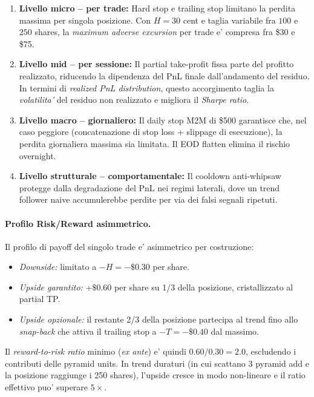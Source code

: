 \documentclass[11pt,a4paper]{article}
\begin{document}
\begin{enumerate}
    \item \textbf{Livello micro -- per trade:}
          Hard stop e trailing stop limitano la perdita massima
          per singola posizione.  Con $H = 30$ cent e taglia
          variabile fra $100$ e $250$ shares, la
          \emph{maximum adverse excursion} per trade e' compresa fra
          \$30 e \$75.
    \item \textbf{Livello mid -- per sessione:}
          Il partial take-profit fissa parte del profitto realizzato,
          riducendo la dipendenza del PnL finale dall'andamento del
          residuo.  In termini di \emph{realized PnL distribution},
          questo accorgimento taglia la \emph{volatilita'} del
          residuo non realizzato e migliora il \emph{Sharpe ratio}.
    \item \textbf{Livello macro -- giornaliero:}
          Il daily stop M2M di \$500 garantisce che, nel caso
          peggiore (concatenazione di stop loss + slippage di
          esecuzione), la perdita giornaliera massima sia limitata.
          Il EOD flatten elimina il rischio overnight.
    \item \textbf{Livello strutturale -- comportamentale:}
          Il cooldown anti-whipsaw protegge dalla degradazione del
          PnL nei regimi laterali, dove un trend follower naive
          accumulerebbe perdite per via dei falsi segnali ripetuti.
\end{enumerate}

\paragraph{Profilo Risk/Reward asimmetrico.}
Il profilo di payoff del singolo trade e' asimmetrico per costruzione:
\begin{itemize}
    \item \emph{Downside:} limitato a $-H = -\$0.30$ per share.
    \item \emph{Upside garantito:} $+\$0.60$ per share su 1/3 della
          posizione, cristallizzato al partial TP.
    \item \emph{Upside opzionale:} il restante 2/3 della posizione
          partecipa al trend fino allo \emph{snap-back} che attiva il
          trailing stop a $-T = -\$0.40$ dal massimo.
\end{itemize}

Il \emph{reward-to-risk ratio} minimo (\emph{ex ante}) e' quindi
$0.60/0.30 = 2.0$, escludendo i contributi delle pyramid units.  In
trend duraturi (in cui scattano 3 pyramid add e la posizione
raggiunge i 250 shares), l'upside cresce in modo non-lineare e il
ratio effettivo puo' superare $5\times$.
\end{document}
